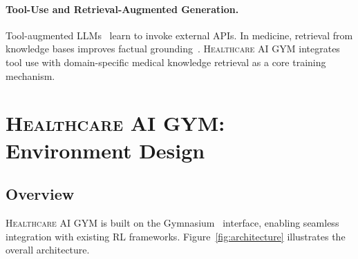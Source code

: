 \documentclass{article}
\newcommand{\gym}{\textsc{Healthcare AI GYM}}
\begin{document}
\paragraph{Tool-Use and Retrieval-Augmented Generation.}
Tool-augmented LLMs~\citep{schick2024toolformer, qin2023toolllm} learn to invoke external APIs. In medicine, retrieval from knowledge bases improves factual grounding~\citep{xiong2024medcpt}. \gym{} integrates tool use with domain-specific medical knowledge retrieval as a core training mechanism.


\section{\gym{}: Environment Design}
\label{sec:environment}

\subsection{Overview}
\label{sec:overview}

\gym{} is built on the Gymnasium~\citep{towers2024gymnasium} interface, enabling seamless integration with existing RL frameworks. Figure~\ref{fig:architecture} illustrates the overall architecture.
\end{document}
